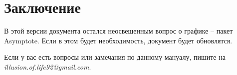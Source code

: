 \section{Заключение}
В этой версии документа остался неосвещенным вопрос о графике -- пакет Asymptote. 
Если в этом будет необходимость, документ будет обновлятся.

Если у вас есть вопросы или замечания по данному мануалу, пишите на 
{\it illusion.of.life92@gmail.com}. 